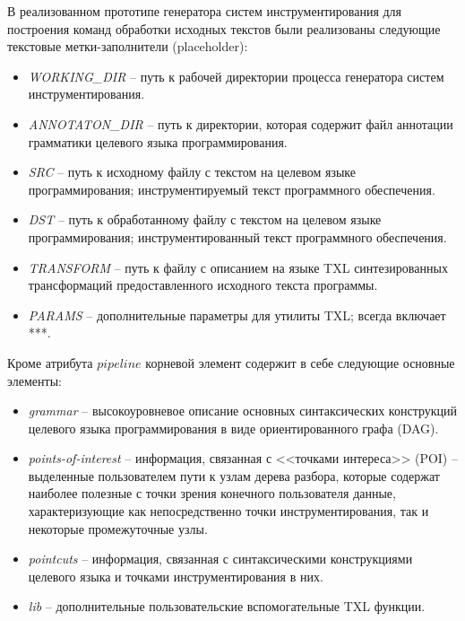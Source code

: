 В реализованном прототипе генератора систем инструментирования для построения команд обработки исходных текстов были реализованы следующие текстовые метки-заполнители (placeholder):

\begin{itemize}[noitemsep]
  \item \textit{WORKING\_DIR}   -- путь к рабочей директории процесса генератора систем инструментирования.
  \item \textit{ANNOTATON\_DIR} -- путь к директории, которая содержит файл аннотации грамматики целевого языка программирования.
  \item \textit{SRC}            -- путь к исходному файлу с текстом на целевом языке программирования; инструментируемый текст программного обеспечения.
  \item \textit{DST}            -- путь к обработанному файлу с текстом на целевом языке программирования; инструментированный текст программного обеспечения.
  \item \textit{TRANSFORM}      -- путь к файлу с описанием на языке TXL синтезированных трансформаций предоставленного исходного текста программы.
  \item \textit{PARAMS}         -- дополнительные параметры для утилиты TXL; всегда включает ***.
\end{itemize}

Кроме атрибута $pipeline$ корневой элемент содержит в себе следующие основные элементы:

\begin{itemize}[noitemsep]
  \item \textit{grammar}            -- высокоуровневое описание основных синтаксических конструкций целевого языка программирования в виде ориентированного графа (DAG).
  \item \textit{points-of-interest} -- информация, связанная с <<точками интереса>> (POI) -- выделенные пользователем пути к узлам дерева разбора, которые содержат наиболее полезные с точки зрения конечного пользователя данные, характеризующие как непосредственно точки инструментирования, так и некоторые промежуточные узлы.
  \item \textit{pointcuts}          -- информация, связанная с синтаксическими конструкциями целевого языка и точками инструментирования в них.
  \item \textit{lib}                -- дополнительные пользовательские вспомогательные TXL функции.
\end{itemize}

